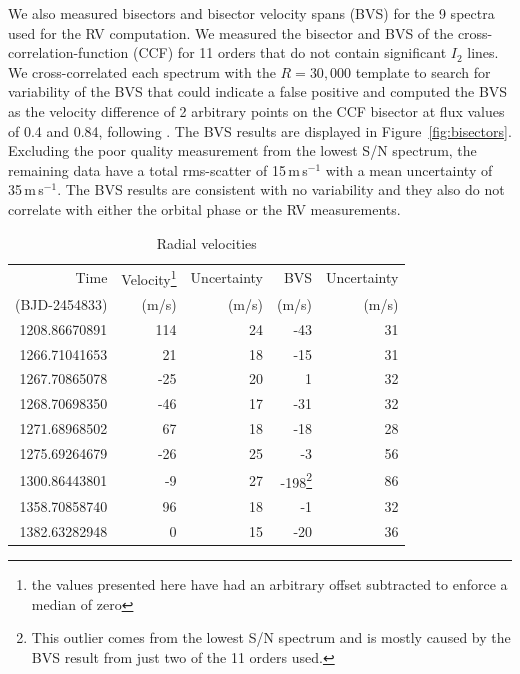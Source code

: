 \documentclass[apjl]{emulateapj}
\begin{document}
We also measured bisectors and bisector velocity spans (BVS) for the 9 spectra used for the RV computation. We measured the bisector and BVS of the cross-correlation-function (CCF) for 11 orders that do not contain significant $I_2$ lines. We cross-correlated each spectrum with the $R=30,000$ template to search for variability of the BVS that could indicate a false positive and computed the BVS as the velocity difference of 2 arbitrary points on the CCF bisector at flux values of 0.4 and 0.84, following \citet{hatzes98}. The BVS results are displayed in Figure~\ref{fig:bisectors}. Excluding the poor
quality measurement from the lowest S/N spectrum, the remaining data have a total rms-scatter of 15\,m\,s$^{-1}$ with a mean uncertainty of 35\,m\,s$^{-1}$. The BVS results are consistent with no variability and they also do not correlate with either the orbital phase or the RV measurements.





\begin{table}\label{tab:rv}
\centering
\caption{Radial velocities}
\begin{tabular}{r r r r r}
Time & Velocity\footnote{the values presented here have had an arbitrary offset subtracted to enforce a median of zero}  & Uncertainty & BVS& Uncertainty \\
(BJD-2454833) & (m/s) & (m/s) & (m/s) & (m/s)\\
\hline
1208.86670891		&	114 		&	24		&	-43	&	31\\
1266.71041653		& 	21		&	18		&	-15	&	31\\
1267.70865078		&	-25 		&	20		&	1	&	32\\
1268.70698350		&	-46		&	17		&	-31	&	32\\
1271.68968502		&	67		&	18		&	-18	&	28\\
1275.69264679		&	-26		&	25		&	-3	&	56\\
1300.86443801 	& 	-9		&	27		&	-198\footnote{This outlier comes from the lowest S/N spectrum and is mostly caused by the BVS result from just two of the 11 orders used.}	&	86\\
1358.70858740 	& 	96		&	18		&	-1	&	32\\
1382.63282948 	& 	0		&	15		&	-20	&	36\\
\hline
\end{tabular}
\end{table}
\end{document}
